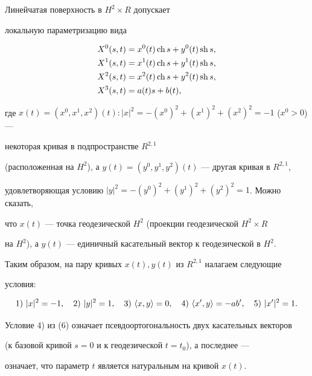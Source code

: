 \begin{pf}


Линейчатая поверхность в $H^2 \times R$ допускает 


локальную параметризацию вида


\begin{align*}


X^0(s,t)&=x^0(t)\ch s+y^0(t)\sh s,\\


X^1(s,t)&=x^1(t)\ch s+y^1(t)\sh s,\\


X^2(s,t)&=x^2(t)\ch s+y^2(t)\sh s,\\


X^3(s,t)&=a(t)s+b(t),


\end{align*}


где $x(t)=(x^0,x^1,x^2)(t):|x|^2= -(x^0)^2+(x^1)^2+(x^2)^2=-1$ ($x^0>0$) --- 


некоторая кривая в подпространстве $R^{2,1}$


(расположенная на $H^2$), а $y(t)=(y^0,y^1,y^2)(t)$ --- другая кривая в $R^{2,1}$, 


удовлетворяющая условию  $|y|^2=-(y^0)^2+(y^1)^2+(y^2)^2=1$. Можно сказать, 


что $x(t)$ --- точка геодезической $H^2$ (проекции геодезической $H^2 \times R$ 


на $H^2$), а $y(t)$ --- единичный касательный вектор к геодезической в $H^2$. 


Таким образом, на пару кривых $x(t),y(t)$ из $R^{2,1}$ налагаем следующие 


условия:


\begin{equation}


1)\ |x|^2=-1,\quad 2)\ |y|^2=1,\quad 3)\ \la x,y\ra=0,


\quad 4)\ \la x',y\ra=-ab',\quad 5)\ |x'|^2=1.


\end{equation}





Условие 4) из (6) означает псевдоортогональность двух касательных векторов


(к базовой кривой $s=0$ и к геодезической $t=t_0$), а последнее ---


означает, что параметр $t$ является натуральным на кривой $x(t)$.


	



\end{pf}

